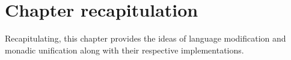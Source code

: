 \documentclass[thesis-solanki.tex]{subfiles}
\begin{document}
\section{Chapter recapitulation}
Recapitulating, this chapter provides the ideas of language modification and monadic unification along with their respective 
implementations. 


\ifMain
\begin{scope}
  \nolinenumbers
  \enotesize
  \par
  \begin{singlespace}
  \setlength{\parskip}{12pt plus 2pt minus 1pt}
  \theendnotes
  \par
  \end{singlespace}
\end{scope}
\fi
\end{document}
